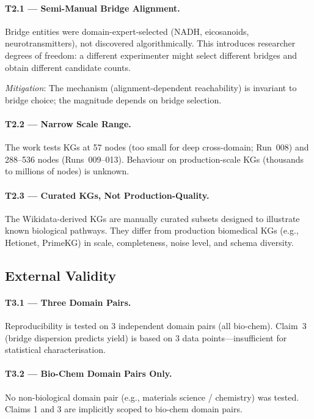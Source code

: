 \paragraph{T2.1 --- Semi-Manual Bridge Alignment.}
Bridge entities were domain-expert-selected (NADH, eicosanoids, neurotransmitters),
not discovered algorithmically.
This introduces researcher degrees of freedom: a different experimenter might
select different bridges and obtain different candidate counts.

\textit{Mitigation}: The mechanism (alignment-dependent reachability) is invariant
to bridge choice; the magnitude depends on bridge selection.

\paragraph{T2.2 --- Narrow Scale Range.}
The work tests KGs at 57 nodes (too small for deep cross-domain; Run~008) and
288--536 nodes (Runs~009--013).
Behaviour on production-scale KGs (thousands to millions of nodes) is unknown.

\paragraph{T2.3 --- Curated KGs, Not Production-Quality.}
The Wikidata-derived KGs are manually curated subsets designed to illustrate
known biological pathways.
They differ from production biomedical KGs (e.g., Hetionet, PrimeKG) in scale,
completeness, noise level, and schema diversity.

\subsection{External Validity}

\paragraph{T3.1 --- Three Domain Pairs.}
Reproducibility is tested on 3 independent domain pairs (all bio-chem).
Claim~3 (bridge dispersion predicts yield) is based on 3 data points---insufficient
for statistical characterisation.

\paragraph{T3.2 --- Bio-Chem Domain Pairs Only.}
No non-biological domain pair (e.g., materials science / chemistry) was tested.
Claims 1 and 3 are implicitly scoped to bio-chem domain pairs.

